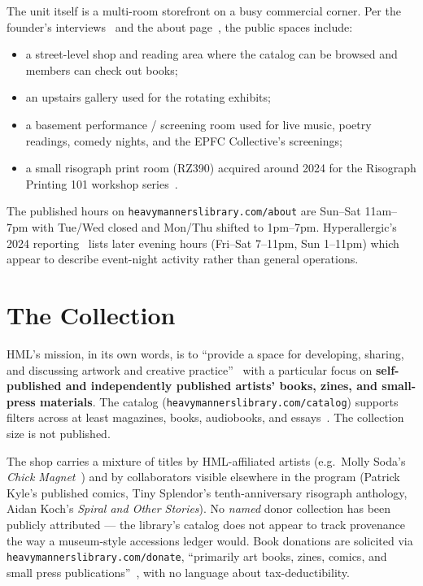 \documentclass[10pt,letterpaper,twocolumn]{article}
\begin{document}
The unit itself is a multi-room storefront on a busy commercial corner. Per the founder's interviews~\citep{eastsider2023, hyperallergic2024indie} and the about page~\citep{hmlsite}, the public spaces include:

\begin{itemize}
\item a street-level shop and reading area where the catalog can be browsed and members can check out books;
\item an upstairs gallery used for the rotating exhibits;
\item a basement performance / screening room used for live music, poetry readings, comedy nights, and the EPFC Collective's screenings;
\item a small risograph print room (RZ390) acquired around 2024 for the Risograph Printing 101 workshop series~\citep{hyperallergic2024indie}.
\end{itemize}

The published hours on \texttt{heavymannerslibrary.com/about} are Sun--Sat 11am--7pm with Tue/Wed closed and Mon/Thu shifted to 1pm--7pm. Hyperallergic's 2024 reporting~\citep{hyperallergic2024indie} lists later evening hours (Fri--Sat 7--11pm, Sun 1--11pm) which appear to describe event-night activity rather than general operations.

\section{The Collection}

HML's mission, in its own words, is to ``provide a space for developing, sharing, and discussing artwork and creative practice''~\citep{hmlsite} with a particular focus on \textbf{self-published and independently published artists' books, zines, and small-press materials}. The catalog (\texttt{heavymannerslibrary.com/catalog}) supports filters across at least magazines, books, audiobooks, and essays~\citep{sjsuischool}. The collection size is not published.

The shop carries a mixture of titles by HML-affiliated artists (e.g.\ Molly Soda's \emph{Chick Magnet}~\citep{hmlsite}) and by collaborators visible elsewhere in the program (Patrick Kyle's published comics, Tiny Splendor's tenth-anniversary risograph anthology, Aidan Koch's \emph{Spiral and Other Stories}). No \emph{named} donor collection has been publicly attributed --- the library's catalog does not appear to track provenance the way a museum-style accessions ledger would. Book donations are solicited via \texttt{heavymannerslibrary.com/donate}, ``primarily art books, zines, comics, and small press publications''~\citep{hmldonate}, with no language about tax-deductibility.
\end{document}
